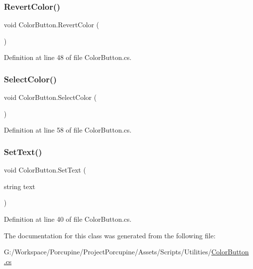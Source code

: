 \subsubsection{\texorpdfstring{Revert\+Color()}{RevertColor()}}
{\footnotesize\ttfamily void Color\+Button.\+Revert\+Color (\begin{DoxyParamCaption}{ }\end{DoxyParamCaption})}



Definition at line 48 of file Color\+Button.\+cs.

\mbox{\label{class_color_button_a0ad9ae5a492eaaa9d5f69072a5e0abf4}} 
\subsubsection{\texorpdfstring{Select\+Color()}{SelectColor()}}
{\footnotesize\ttfamily void Color\+Button.\+Select\+Color (\begin{DoxyParamCaption}{ }\end{DoxyParamCaption})}



Definition at line 58 of file Color\+Button.\+cs.

\mbox{\label{class_color_button_a00897650eed8cb5e483b2e682f8ba0e5}} 
\subsubsection{\texorpdfstring{Set\+Text()}{SetText()}}
{\footnotesize\ttfamily void Color\+Button.\+Set\+Text (\begin{DoxyParamCaption}\item[{string}]{text }\end{DoxyParamCaption})}



Definition at line 40 of file Color\+Button.\+cs.



The documentation for this class was generated from the following file\+:\begin{DoxyCompactItemize}
\item 
G\+:/\+Workspace/\+Porcupine/\+Project\+Porcupine/\+Assets/\+Scripts/\+Utilities/\hyperlink{_color_button_8cs}{Color\+Button.\+cs}\end{DoxyCompactItemize}
